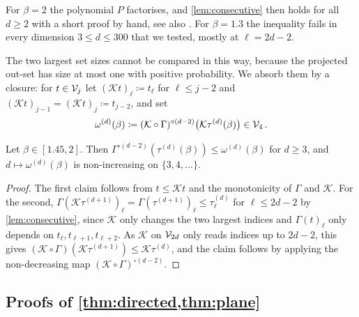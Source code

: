 \documentclass[11pt,letterpaper]{article}
\begin{document}
For $\beta=2$ the polynomial $P$ factorises, and \cref{lem:consecutive} then holds for all $d\ge2$ with a short proof by hand, see also \cite[Lemma~2.4]{LXZ26}. For $\beta=1.3$ the inequality fails in every dimension $3\le d\le300$ that we tested, mostly at $\ell=2d-2$.

The two largest set sizes cannot be compared in this way, because the projected out-set has size at most one with positive probability. We absorb them by a closure: for $t\in\mathcal V_j$ let $(\mathcal Kt)_\ell\coloneqq t_\ell$ for $\ell\le j-2$ and $(\mathcal Kt)_{j-1}=(\mathcal Kt)_j\coloneqq t_{j-2}$, and set
\begin{equation*}
\omega^{(d)}(\beta)\coloneqq(\mathcal K\circ\Gamma)^{\circ(d-2)}\big(\mathcal K\tau^{(d)}(\beta)\big)\in\mathcal V_4\,.
\end{equation*}

\begin{lemma}\label{lem:omega}
Let $\beta\in[1.45,2]$. Then $\Gamma^{\circ(d-2)}(\tau^{(d)}(\beta))\le\omega^{(d)}(\beta)$ for $d\ge3$, and $d\mapsto\omega^{(d)}(\beta)$ is non-increasing on $\{3,4,\dots\}$.
\end{lemma}

\begin{proof}
The first claim follows from $t\le\mathcal Kt$ and the monotonicity of $\Gamma$ and $\mathcal K$. For the second, $\Gamma(\mathcal K\tau^{(d+1)})_\ell=\Gamma(\tau^{(d+1)})_\ell\le\tau^{(d)}_\ell$ for $\ell\le2d-2$ by \cref{lem:consecutive}, since $\mathcal K$ only changes the two largest indices and $\Gamma(t)_\ell$ only depends on $t_\ell,t_{\ell+1},t_{\ell+2}$. As $\mathcal K$ on $\mathcal V_{2d}$ only reads indices up to $2d-2$, this gives $(\mathcal K\circ\Gamma)(\mathcal K\tau^{(d+1)})\le\mathcal K\tau^{(d)}$, and the claim follows by applying the non-decreasing map $(\mathcal K\circ\Gamma)^{\circ(d-2)}$.
\end{proof}

\subsection{Proofs of \texorpdfstring{\cref{thm:directed,thm:plane}}{the results for the directed graph}}
\end{document}
